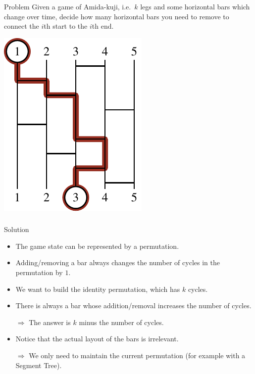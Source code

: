 \begin{frame}
  \frametitle{\problemtitle}
  \begin{block}{Problem}
  	Given a game of Amida-kuji, i.e.\ $k$ legs and some horizontal bars which change over time, decide how many horizontal bars you need to remove to connect the $i$th start to the $i$th end.
  \end{block}
  \begin{center}
  	\includegraphics[height=0.65\textheight]{sample}
  \end{center}
\end{frame}

\begin{frame}
	\frametitle{\problemtitle}
	\begin{block}{Solution}
		\begin{itemize}
			\item The game state can be represented by a permutation.
			\item Adding/removing a bar always changes the number of cycles in the permutation by $1$.
			\item We want to build the identity permutation, which has $k$ cycles.
			\pause
			\item There is always a bar whose addition/removal increases the number of cycles.
			\item[$\Rightarrow$] The answer is $k$ minus the number of cycles.			
			\pause
			\item Notice that the actual layout of the bars is irrelevant.
			\item[$\Rightarrow$] We only need to maintain the current permutation (for example with a Segment Tree).
		\end{itemize}
	\end{block}
\end{frame}
